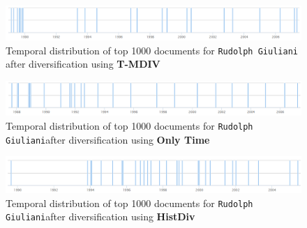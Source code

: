 \begin{figure}[!h]
\centering
 \includegraphics[width=\textwidth]{images/rg_timeline_mdiv30.png}
    \caption{Temporal distribution of top 1000 documents for \texttt{Rudolph Giuliani} after diversification using \textbf{T-MDIV}}
    \label{fig:temporal_rg}
\end{figure}

\begin{figure}[!h]
\centering
 \includegraphics[width=\textwidth]{images/rg_timeline_lmtd30.png}
    \caption{Temporal distribution of top 1000 documents for \texttt{Rudolph Giuliani}after diversification using \textbf{Only Time}}
    \label{fig:temporal_rg}
\end{figure}

\begin{figure}[!h]
\centering
 \includegraphics[width=\textwidth]{images/rg_timeline_histdiv30.png}
    \caption{Temporal distribution of top 1000 documents for \texttt{Rudolph Giuliani}after diversification using \textbf{HistDiv}}
    \label{fig:temporal_rg}
\end{figure}





